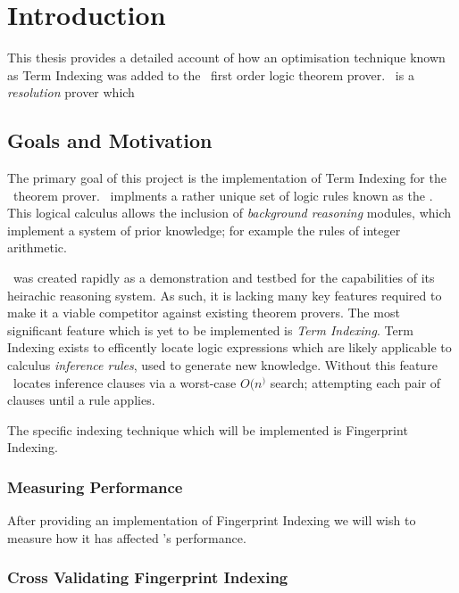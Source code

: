 
\chapter{Introduction}
\label{cha:intro}

This thesis provides a detailed account of how an optimisation technique known
as Term Indexing was added to the \beagle\ first order logic theorem prover. \Beagle\ 
is a \emph{resolution} prover which 

\section{Goals and Motivation}
\label{sec:mot}

The primary goal of this project is the implementation of Term Indexing
for the \beagle\ theorem prover. \Beagle\ implments a rather unique set of logic rules known as the \emph{\HSWAC} \cite{baum13}.
This logical calculus allows the inclusion of \emph{background reasoning} modules,
which implement a system of prior knowledge; for example the rules of integer arithmetic.

\Beagle\ was created rapidly as a demonstration and testbed for the capabilities
of its heirachic reasoning system. As such, it is lacking many key features required
to make it a viable competitor against existing theorem provers. The most significant
feature which is yet to be implemented is \emph{Term Indexing}. Term Indexing exists
to efficently locate logic expressions which are likely applicable to calculus \emph{inference rules},
used to generate new knowledge. Without this feature \beagle\ locates inference clauses
via a worst-case $O(n^)$ search; attempting each pair of clauses until a rule applies.

The specific indexing technique which will be implemented is Fingerprint Indexing.


\subsection{Measuring Performance}

After providing an implementation of Fingerprint Indexing we will wish to measure
how it has affected \beagle's performance.

\subsection{Cross Validating Fingerprint Indexing}

